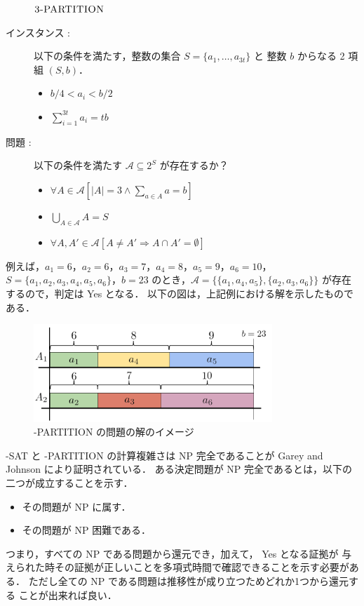 \documentclass[12pt]{optlab-bachelor}
\begin{document}

\begin{description}
  \item[] ${\mbox {\bf {\sc 3-PARTITION}}}$
  \item[インスタンス : ] 以下の条件を満たす，整数の集合 $S = \{a_1,\ldots,a_{3t}\}$ と 整数 $b$ からなる 2 項組 $(S,b)$．
  \begin{itemize}
    \item $b/4 < a_i < b/2$
    \item $\displaystyle \sum_{i = 1}^{3t}a_i = tb$
  \end{itemize}
  \item[問題 : ] 以下の条件を満たす $\mathcal{A} \subseteq 2^S$ が存在するか？
  \begin{itemize}
    \item $\forall A \in \mathcal{A}[|A| = 3 \land \sum_{a \in A} a = b]$
    \item $\bigcup_{A \in \mathcal{A}} A = S$
    \item $\forall A, A' \in \mathcal{A}[A \neq A' \Rightarrow A \cap A' = \emptyset]$
  \end{itemize}
\end{description}

例えば，$a_1 = 6$，$a_2 = 6$，$a_3 = 7$，$a_4 = 8$，$a_5 = 9$，$a_6 = 10$，$S = \{a_1, a_2, a_3, a_4, a_5, a_6\}$，$b = 23$ のとき，$\mathcal{A} = \big\{\{a_1, a_4, a_5\}, \{a_2, a_3, a_6\} \big\}$ が存在するので，判定は Yes となる．
以下の図は，上記例における解を示したものである．
\begin{figure}[h]
  \centering
  \includegraphics[width = 9cm]{figure/3-PARTITION.pdf}
  \caption{{-PARTITION} の問題の解のイメージ}
\end{figure}

{-SAT} と {-PARTITION} の計算複雑さは NP 完全であることが Garey and Johnson \cite{3SAT} により証明されている．
ある決定問題が NP 完全であるとは，以下の二つが成立することを示す．
\begin{itemize}
  \item その問題が NP に属す．
  \item その問題が NP 困難である．
\end{itemize}
つまり，すべての NP である問題から還元でき，加えて， Yes となる証拠が
与えられた時その証拠が正しいことを多項式時間で確認できることを示す必要がある．
ただし全ての NP である問題は推移性が成り立つためどれか1つから還元する
ことが出来れば良い．
\end{document}
